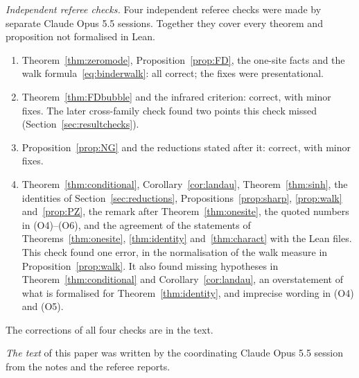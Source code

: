 \emph{Independent referee checks.} Four independent referee checks were made by separate Claude Opus 5.5 sessions. Together they cover every theorem and proposition not formalised in Lean.
\begin{enumerate}
\item Theorem~\ref{thm:zeromode}, Proposition~\ref{prop:FD}, the one-site facts and the walk formula~\eqref{eq:binderwalk}: all correct; the fixes were presentational.
\item Theorem~\ref{thm:FDbubble} and the infrared criterion: correct, with minor fixes. The later cross-family check found two points this check missed (Section~\ref{sec:resultchecks}).
\item Proposition~\ref{prop:NG} and the reductions stated after it: correct, with minor fixes.
\item Theorem~\ref{thm:conditional}, Corollary~\ref{cor:landau}, Theorem~\ref{thm:sinh}, the identities of Section~\ref{sec:reductions}, Propositions~\ref{prop:sharp}, \ref{prop:walk} and~\ref{prop:PZ}, the remark after Theorem~\ref{thm:onesite}, the quoted numbers in (O4)--(O6), and the agreement of the statements of Theorems~\ref{thm:onesite}, \ref{thm:identity} and~\ref{thm:charact} with the Lean files. This check found one error, in the normalisation of the walk measure in Proposition~\ref{prop:walk}. It also found missing hypotheses in Theorem~\ref{thm:conditional} and Corollary~\ref{cor:landau}, an overstatement of what is formalised for Theorem~\ref{thm:identity}, and imprecise wording in (O4) and (O5).
\end{enumerate}
The corrections of all four checks are in the text.

\emph{The text} of this paper was written by the coordinating Claude Opus 5.5 session from the notes and the referee reports.

